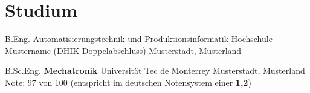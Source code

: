 \section{Studium}
            {B.Eng. Automatisierungstechnik und Produktionsinformatik}
            {Hochschule Mustername (DHIK-Doppelabschluss)}
            {Musterstadt, Musterland}
            {}
            {} 
    
    \vspace{10pt}
    
            {B.Sc.Eng. \textbf{Mechatronik}}
            {Universität Tec de Monterrey}
            {Musterstadt, Musterland}
            {}
            {Note: 97 von 100 (entspricht im deutschen Notensystem einer \textbf{1,2})}
